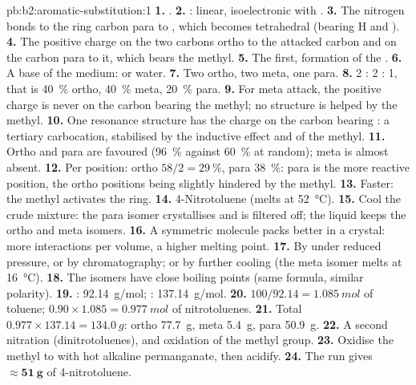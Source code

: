 \begin{solution}{pb:b2:aromatic-substitution:1}
\textbf{1.} .
\textbf{2.} : linear, isoelectronic with .
\textbf{3.} The nitrogen bonds to the ring carbon para to , which becomes tetrahedral
(bearing H and ).
\textbf{4.} The positive charge on the two carbons ortho to the attacked carbon and on the
carbon para to it, which bears the methyl.
\textbf{5.} The first, formation of the .
\textbf{6.} A base of the medium:  or water.
\textbf{7.} Two ortho, two meta, one para.
\textbf{8.} 2 : 2 : 1, that is 40~\% ortho, 40~\% meta, 20~\% para.
\textbf{9.} For meta attack, the positive charge is never on the carbon bearing the methyl; no
structure is helped by the methyl.
\textbf{10.} One resonance structure has the charge on the carbon bearing : a tertiary
carbocation, stabilised by the inductive effect and  of the methyl.
\textbf{11.} Ortho and para are favoured (96~\% against 60~\% at random); meta is almost absent.
\textbf{12.} Per position: ortho $58/2 = 29~\%$, para 38~\%: para is the more reactive position,
the ortho positions being slightly hindered by the methyl.
\textbf{13.} Faster: the methyl activates the ring.
\textbf{14.} 4-Nitrotoluene (melts at \qty{52}{\degreeCelsius}).
\textbf{15.} Cool the crude mixture: the para isomer crystallises and is filtered off; the
liquid keeps the ortho and meta isomers.
\textbf{16.} A symmetric molecule packs better in a crystal: more interactions per volume,
a higher melting point.
\textbf{17.} By  under reduced pressure, or by chromatography; or by
further cooling (the meta isomer melts at \qty{16}{\degreeCelsius}).
\textbf{18.} The isomers have close boiling points (same formula, similar polarity).
\textbf{19.} : \qty{92.14}{g/mol}; : \qty{137.14}{g/mol}.
\textbf{20.} $100/92.14 = \qty{1.085}{mol}$ of toluene; $0.90 \times 1.085 = \qty{0.977}{mol}$ of
nitrotoluenes.
\textbf{21.} Total $0.977 \times 137.14 = \qty{134.0}{g}$: ortho \qty{77.7}{g}, meta
\qty{5.4}{g}, para \qty{50.9}{g}.
\textbf{22.} A second nitration (dinitrotoluenes), and oxidation of the methyl group.
\textbf{23.} Oxidise the methyl to  with hot alkaline permanganate, then acidify.
\textbf{24.} The run gives $\boldsymbol{\approx \qty{51}{g}}$ of 4-nitrotoluene.
\end{solution}

